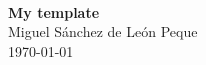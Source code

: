 \begin{titlepage}
\begin{center}
	\ \\%
	\vspace{7.0cm}
	\LARGE{\textbf{My template}} \\
	\vspace{1.0cm}
	\Large{Miguel Sánchez de León Peque} \\
	\vspace{0.5cm}
	\large{\today}
\end{center}
\end{titlepage}

